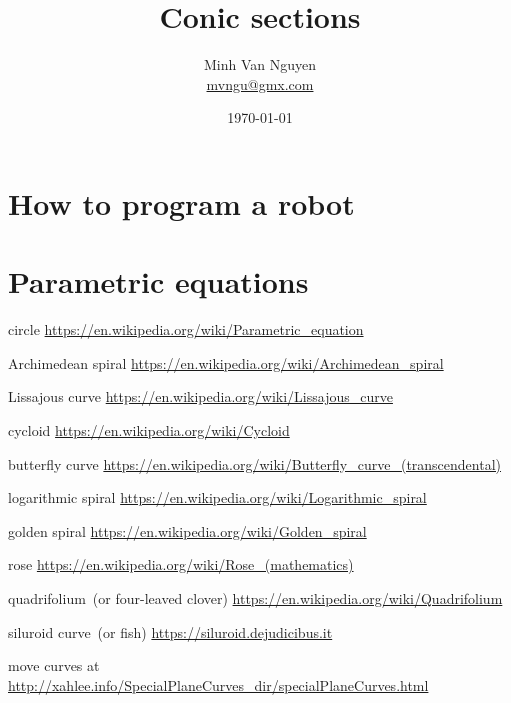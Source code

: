 \documentclass[a4paper,oneside,12pt]{article}
\begin{document}
\title{\Large\bf Conic sections}
\author{%
  Minh Van Nguyen \\
  \url{mvngu@gmx.com}
}
\date{\today}
\maketitle



\section{How to program a robot}



\section{Parametric equations}

{\color{red}
\begin{packeditem}
\item circle
  \url{https://en.wikipedia.org/wiki/Parametric_equation}

\item Archimedean spiral
  \url{https://en.wikipedia.org/wiki/Archimedean_spiral}

\item Lissajous curve
  \url{https://en.wikipedia.org/wiki/Lissajous_curve}

\item cycloid
  \url{https://en.wikipedia.org/wiki/Cycloid}

\item butterfly curve
  \url{https://en.wikipedia.org/wiki/Butterfly_curve_(transcendental)}

\item logarithmic spiral
  \url{https://en.wikipedia.org/wiki/Logarithmic_spiral}

\item golden spiral
  \url{https://en.wikipedia.org/wiki/Golden_spiral}

\item rose
  \url{https://en.wikipedia.org/wiki/Rose_(mathematics)}

\item quadrifolium~(or four-leaved clover)
  \url{https://en.wikipedia.org/wiki/Quadrifolium}

\item siluroid curve~(or fish)
  \url{https://siluroid.dejudicibus.it}

\item move curves at
  \url{http://xahlee.info/SpecialPlaneCurves_dir/specialPlaneCurves.html}
\end{packeditem}
}
\end{document}
